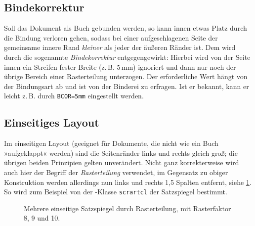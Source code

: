 \subsection{Bindekorrektur}

Soll das Dokument als Buch gebunden werden, so kann innen etwas Platz durch die
Bindung verloren gehen, sodass bei einer aufgeschlagenen Seite der gemeinsame
innere Rand \emph{kleiner} als jeder der äußeren Ränder ist. Dem wird durch die
sogenannte \emph{Bindekorrektur} entgegengewirkt: Hierbei wird von der Seite
innen ein Streifen fester Breite (z.\,B. 5\,mm) ignoriert und dann nur noch der
übrige Bereich einer Rasterteilung unterzogen. Der erforderliche Wert hängt von
der Bindungsart ab und ist von der Binderei zu erfragen. Ist er bekannt, kann er
leicht z.\,B. durch \verb!BCOR=5mm! eingestellt werden.

\subsection{Einseitiges Layout}

Im einseitigen Layout (geeignet für Dokumente, die nicht wie ein Buch
»aufgeklappt« werden) sind die Seitenränder links und rechts gleich groß; die
übrigen beiden Prinzipien gelten unverändert. Nicht ganz korrekterweise wird
auch hier der Begriff der \emph{Rasterteilung} verwendet, im Gegensatz zu obiger
Konstruktion werden allerdings nun links und rechts 1,5 Spalten entfernt, siehe
\cref{fig:einseitig}. So wird zum Beispiel von der -Klasse
\verb!scrartcl! der Satzspiegel bestimmt.

\begin{figure}
  \centering
  \quad
  \quad
  \caption{Mehrere einseitige Satzspiegel durch Rasterteilung, mit
    Rasterfaktor 8, 9 und 10.}\label{fig:einseitig}
\end{figure}

